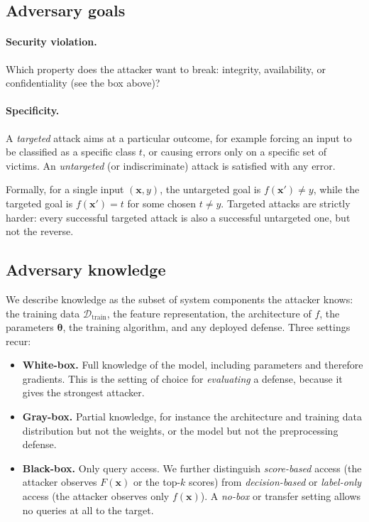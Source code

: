 \documentclass[10pt,a4paper]{extarticle}
\theoremstyle{definition}
\newcommand{\D}{\mathcal{D}}
\newcommand{\x}{\mathbf{x}}
\newcommand{\xadv}{\mathbf{x}'}
\newcommand{\btheta}{\boldsymbol{\theta}}
\begin{document}
\subsection{Adversary goals}

\paragraph{Security violation.} Which property does the attacker want to break: integrity, availability, or confidentiality (see the box above)?

\paragraph{Specificity.} A \emph{targeted} attack aims at a particular outcome, for example forcing an input to be classified as a specific class \(t\), or causing errors only on a specific set of victims. An \emph{untargeted} (or indiscriminate) attack is satisfied with any error.

Formally, for a single input \((\x, y)\), the untargeted goal is \(f(\xadv) \neq y\), while the targeted goal is \(f(\xadv) = t\) for some chosen \(t \neq y\). Targeted attacks are strictly harder: every successful targeted attack is also a successful untargeted one, but not the reverse.

\subsection{Adversary knowledge}

We describe knowledge as the subset of system components the attacker knows: the training data \(\D_{\text{train}}\), the feature representation, the architecture of \(f\), the parameters \(\btheta\), the training algorithm, and any deployed defense. Three settings recur:

\begin{itemize}
  \item \textbf{White-box.} Full knowledge of the model, including parameters and therefore gradients. This is the setting of choice for \emph{evaluating} a defense, because it gives the strongest attacker.
  \item \textbf{Gray-box.} Partial knowledge, for instance the architecture and training data distribution but not the weights, or the model but not the preprocessing defense.
  \item \textbf{Black-box.} Only query access. We further distinguish \emph{score-based} access (the attacker observes \(F(\x)\) or the top-\(k\) scores) from \emph{decision-based} or \emph{label-only} access (the attacker observes only \(f(\x)\)). A \emph{no-box} or transfer setting allows no queries at all to the target.
\end{itemize}
\end{document}
